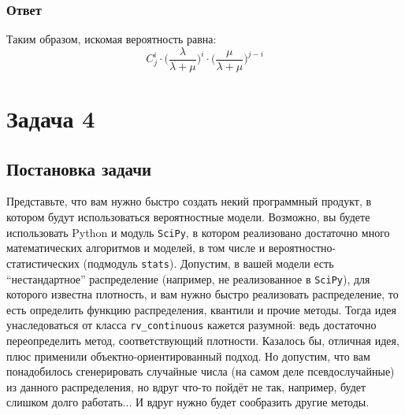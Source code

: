 \documentclass[a4paper,14pt]{extarticle}
\begin{document}
            \subsubsection*{Ответ}
                
                Таким образом, искомая вероятность равна:
                \[
                    \boxed{C_j^i \cdot \big(\frac{\lambda}{\lambda+\mu}\big)^i \cdot \big(\frac{\mu}{\lambda+\mu}\big)^{j-i}}
                \]


    
    
    \section*{Задача 4}
        
        \subsection*{Постановка задачи}
            
            Представьте, что вам нужно быстро создать некий программный продукт, в котором будут использоваться вероятностные модели. Возможно, вы будете использовать Python и модуль \texttt{SciPy}, в котором реализовано достаточно много математических алгоритмов и моделей, в том числе и вероятностно-статистических (подмодуль \texttt{stats}). Допустим, в вашей модели есть ``нестандартное'' распределение (например, не реализованное в \texttt{SciPy}), для которого известна плотность, и вам нужно быстро реализовать распределение, то есть определить функцию распределения, квантили и прочие методы. Тогда идея унаследоваться от класса \texttt{rv\_continuous} кажется разумной: ведь достаточно переопределить метод, соответствующий плотности. Казалось бы, отличная идея, плюс применили объектно-ориентированный подход. Но допустим, что вам понадобилось сгенерировать случайные числа (на самом деле псевдослучайные) из данного распределения, но вдруг что-то пойдёт не так, например, будет слишком долго работать... И вдруг нужно будет сообразить другие методы.
            
\end{document}
